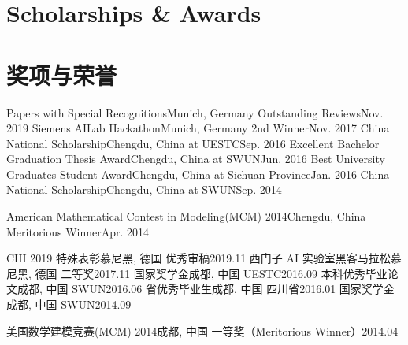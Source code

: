 
 {
\section{\textbf{Scholarships \& Awards}}
}{
\section{\textbf{奖项与荣誉}}
}

 {
  \resumeSubHeadingListStart
  \small
    \resumeSubheading
        {Papers with Special Recognitions}{Munich, Germany}
        {Outstanding Reviews}{Nov. 2019}
    \resumeSubheading
        {Siemens AILab Hackathon}{Munich, Germany}
        {2nd Winner}{Nov. 2017}
    \resumeSubheading
        {China National Scholarship}{Chengdu, China}
        {at UESTC}{Sep. 2016}
    \resumeSubheading
        {Excellent Bachelor Graduation Thesis Award}{Chengdu, China}
        {at SWUN}{Jun. 2016}
    \resumeSubheading
        {Best University Graduates Student Award}{Chengdu, China}
        {at Sichuan Province}{Jan. 2016}
    \resumeSubheading
        {China National Scholarship}{Chengdu, China}
        {at SWUN}{Sep. 2014}

    \resumeSubheading
        {American Mathematical Contest in Modeling(MCM) 2014}{Chengdu, China}
        {Meritorious Winner}{Apr. 2014}
  \resumeSubHeadingListEnd
}{

    \resumeSubHeadingListStart
    \small
    \resumeSubheading
        {CHI 2019 特殊表彰}{慕尼黑, 德国}
        {优秀审稿}{2019.11}
    \resumeSubheading
        {西门子 AI 实验室黑客马拉松}{慕尼黑, 德国}
        {二等奖}{2017.11}
    \resumeSubheading
        {国家奖学金}{成都, 中国}
        {UESTC}{2016.09}
    \resumeSubheading
        {本科优秀毕业论文}{成都, 中国}
        {SWUN}{2016.06}
    \resumeSubheading
        {省优秀毕业生}{成都, 中国}
        {四川省}{2016.01}
    \resumeSubheading
        {国家奖学金}{成都, 中国}
        {SWUN}{2014.09}

    \resumeSubheading
        {美国数学建模竞赛(MCM) 2014}{成都, 中国}
        {一等奖（Meritorious Winner）}{2014.04}
  \resumeSubHeadingListEnd

}